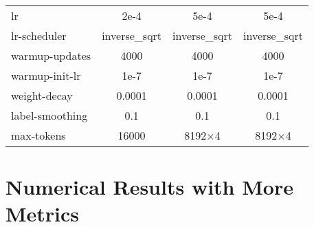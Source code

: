 \documentclass{article} %
\begin{document}
\begin{table}[h]
\begin{tabular}{lccc}
lr                      & 2e-4                                                                                        & 5e-4                                                                                 & 5e-4                                                                                \\
lr-scheduler            & inverse\_sqrt                                                                               & inverse\_sqrt                                                                        & inverse\_sqrt                                                                       \\
warmup-updates          & 4000                                                                                        & 4000                                                                                 & 4000                                                                                \\
warmup-init-lr          & 1e-7                                                                                        & 1e-7                                                                                 & 1e-7                                                                                \\
weight-decay            & 0.0001                                                                                      & 0.0001                                                                               & 0.0001                                                                              \\
label-smoothing         & 0.1                                                                                         & 0.1                                                                                  & 0.1                                                                                 \\
max-tokens              & 16000                                                                                       & 8192$\times$4                                                                               & 8192$\times$4      \\\hline                                                                       
\end{tabular}
\end{table}


\section{Numerical Results with More Metrics}
\label{app:numerical}
\end{document}
